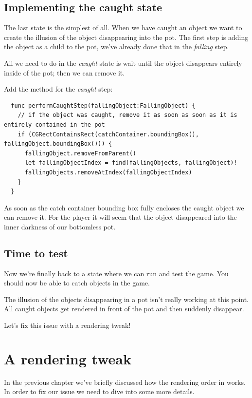 \subsection{Implementing the caught state}
The last state is the simplest of all. When we have caught an object we want to
create the illusion of the object disappearing into the pot. The first step is
adding the object as a child to the pot, we've already done that in the
\textit{falling} step. 

All we need to do in the \textit{caught} state is wait until the object
disappears entirely inside of the pot; then we can remove it.

\begin{leftbar}
Add the method for the \textit{caught} step:
\begin{lstlisting}
  func performCaughtStep(fallingObject:FallingObject) {
    // if the object was caught, remove it as soon as soon as it is entirely contained in the pot
    if (CGRectContainsRect(catchContainer.boundingBox(), fallingObject.boundingBox())) {
      fallingObject.removeFromParent()
      let fallingObjectIndex = find(fallingObjects, fallingObject)!
      fallingObjects.removeAtIndex(fallingObjectIndex)
    }
  }
\end{lstlisting}
\end{leftbar}

As soon as the catch container bounding box fully encloses the caught object we
can remove it. For the player it will seem that the object disappeared into the
inner darkness of our bottomless pot.

\subsection{Time to test}
Now we're finally back to a state where we can run and test the game. You should
now be able to catch objects in the game. 

The illusion of the objects disappearing in a pot isn't really working at this
point. All caught objects get rendered in front of the pot and then suddenly
disappear.

Let's fix this issue with a rendering tweak!

\section{A rendering tweak}\label{rendering_tweak}

In the previous chapter we've briefly discussed how the rendering order in
\cocos{} works. In order to fix our issue we need to dive into some more
details.

